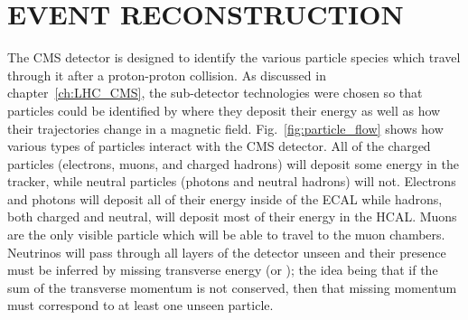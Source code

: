 %
%
%



\chapter{\uppercase {Event Reconstruction}}
\label{ch:event_reconstruction}

The CMS detector is designed to identify the various particle species which travel through it after a proton-proton collision.
As discussed in chapter~\ref{ch:LHC_CMS}, the sub-detector technologies were chosen so that particles could be identified by where they deposit their energy as well as how their trajectories change in a magnetic field.
Fig.~\ref{fig:particle_flow} shows how various types of particles interact with the CMS detector.
All of the charged particles (\ie electrons, muons, and charged hadrons) will deposit some energy in the tracker, while neutral particles (\ie photons and neutral hadrons) will not.
Electrons and photons will deposit all of their energy inside of the ECAL while hadrons, both charged and neutral, will deposit most of their energy in the HCAL.
Muons are the only visible particle which will be able to travel to the muon chambers.
Neutrinos will pass through all layers of the detector unseen and their presence must be inferred by missing transverse energy (\MET or \ETslash); the idea being that if the sum of the transverse momentum is not conserved, then that missing momentum must correspond to at least one unseen particle.

